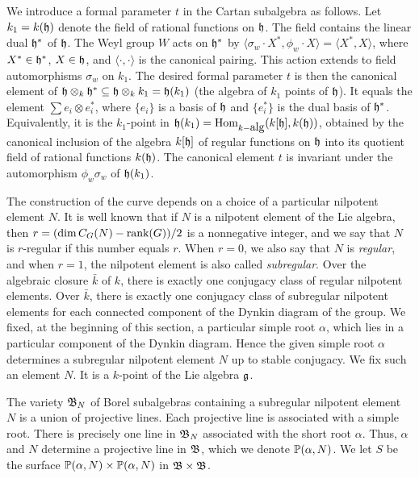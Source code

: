 \documentclass{amsart}
\begin{document}
We introduce a formal parameter $t$ in the Cartan subalgebra as follows.
Let $k_1=k({\frak h})$ denote the field of rational functions on ${\frak h}$.  
The field contains the linear dual ${\frak h}^*$ of ${\frak h}$.
The Weyl group $W$ acts on ${\frak h}^*$ by $\langle\sigma_w\cdot X^*,\phi_w\cdot X\rangle
=\langle X^*,X\rangle$, where $X^*\in{\frak h}^*$, $X\in{\frak h}$, and $\langle\cdot,\cdot
\rangle$ is the canonical pairing.  This action extends to field
automorphisms $\sigma_w$ on $k_1$.  The desired formal parameter $t$
is then the canonical element of ${\frak h}\otimes_k{\frak h}^* \subseteq {\frak h}\otimes_k k_1
= {\frak h}(k_1)$
(the algebra of $k_1$ points of ${\frak h}$).  It equals
the element $\sum e_i\otimes e_i^*$, where $\{e_i\}$ is a basis of ${\frak h}$
and $\{e_i^*\}$ is the dual basis of ${\frak h}^*$.  Equivalently, it is
the $k_1$-point in ${\frak h}(k_1) = \hbox{Hom}_{k-\hbox{alg}}(k[{\frak h}],k({\frak h}))$,
obtained by the canonical inclusion of the algebra $k[{\frak h}]$ of regular
functions on ${\frak h}$ into its quotient field of rational functions $k({\frak h})$.
The canonical element $t$ is invariant under the automorphism
$\phi_w\sigma_w$ of ${\frak h}(k_1)$.

The construction of the curve depends on a choice of a particular
nilpotent element $N$.  It is well known that if $N$ is a nilpotent
element of the Lie algebra, then 
$r=(\dim C_G(N) - \hbox{rank}(G))/2$ is a nonnegative integer, and we say that
$N$ is $r$-regular if this number equals $r$.  When $r=0$, we also
say that $N$ is {\it regular}, and
when $r=1$, the nilpotent element is also
called {\it subregular}.  
Over the algebraic closure $\bar k$ of $k$, there
is exactly one conjugacy class of regular nilpotent elements.  
Over $\bar k$, 
there is exactly one conjugacy class of subregular nilpotent
elements for each connected component of the Dynkin diagram of the
group.  We fixed, at the beginning of this section, a particular
simple root $\alpha$, which lies in
a particular component of the Dynkin diagram.  Hence the
given simple root $\alpha$ determines a subregular nilpotent element $N$ up to
stable
conjugacy.  We fix such an element $N$.  It is a $k$-point of the
Lie algebra ${\frak g}$.

The variety ${\frak B}_N$ of Borel subalgebras containing a subregular nilpotent element
$N$ is a union of projective lines.  Each projective line is associated
with a simple root.  There is precisely one line in ${\frak B}_N$ associated
with the short root $\alpha$.  Thus, $\alpha$ and $N$ determine a
projective line in ${\frak B}$, which we denote ${\Bbb P}(\alpha,N)$.
We let $S$
be the surface ${\Bbb P}(\alpha,N)\times {\Bbb P}(\alpha,N)$
in ${\frak B}\times {\frak B}$.
\end{document}
